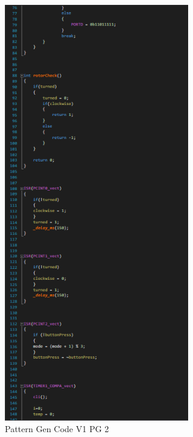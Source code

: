 \documentclass[12pt]{article}
\begin{document}
        \begin{figure}[htp]
            \centering
            \includegraphics[width=8cm]{Pattern Gen Code V1 PG 2.png}
            \caption{Pattern Gen Code V1 PG 2}
        \end{figure}
\end{document}
